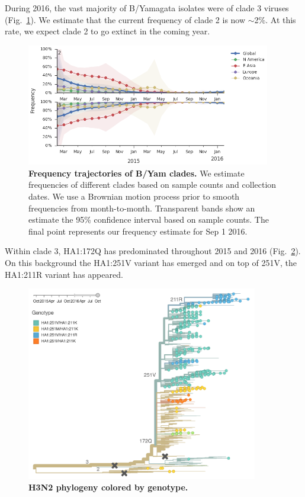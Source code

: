 \documentclass[11pt,oneside,letterpaper]{article}
\begin{document}
\pagebreak

During 2016, the vast majority of B/Yamagata isolates were of clade 3 viruses (Fig.\ \ref{Yam_clades}). We estimate that the current frequency of clade 2 is now $\sim$2\%. At this rate, we expect clade 2 to go extinct in the coming year.

\begin{figure}[H]
	\centering
	\includegraphics[width=0.95\textwidth]{../figures/feb-2016/Yam_clades.png}
	\caption{\textbf{Frequency trajectories of B/Yam clades.}
	We estimate frequencies of different clades based on sample counts and collection dates.
	We use a Brownian motion process prior to smooth frequencies from month-to-month.
	Transparent bands show an estimate the 95\% confidence interval based on sample counts.
	The final point represents our frequency estimate for Sep 1 2016.
	}
	\label{Yam_clades}
\end{figure}

\pagebreak

Within clade 3, HA1:172Q has predominated throughout 2015 and 2016 (Fig.\ \ref{Yam_tree}). On this background the HA1:251V variant has emerged and on top of 251V, the HA1:211R variant has appeared.

\begin{figure}[H]
	\centering
	\includegraphics[width=0.9\textwidth]{../figures/sep-2016/Yam_tree.png}
	\caption{\textbf{H3N2 phylogeny colored by genotype.}
	}
	\label{Yam_tree}
\end{figure}
\end{document}
